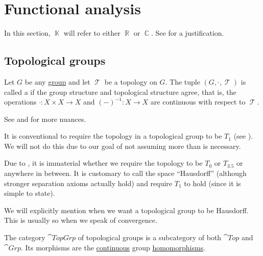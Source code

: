 \section{Functional analysis}\label{sec:functional_analysis}

In this section, \( \BbbK \) will refer to either \( \BbbR \) or \( \BbbC \). See  for a justification.

\subsection{Topological groups}\label{subsec:topological_groups}

\begin{definition}\label{def:topological_group}
  Let \( G \) be any \hyperref[def:group]{group} and let \( \mscrT \) be a topology on \( G \). The tuple \( (G, \cdot, \mscrT) \) is called a  if the group structure and topological structure agree, that is, the operations \( \cdot: X \times X \to X \) and \( (-)^{-1}: X \to X \) are continuous with respect to \( \mscrT \).

  See  and  for more nuances.
\end{definition}

\begin{remark}\label{rem:hausdorff_topological_groups}
  It is conventional to require the topology in a topological group to be \( T_1 \) (see ). We will not do this due to our goal of not assuming more than is necessary.

  Due to , it is immaterial whether we require the topology to be \( T_0 \) or \( T_{3.5} \) or anywhere in between. It is customary to call the space \enquote{Hausdorff} (although stronger separation axioms actually hold) and require \( T_1 \) to hold (since it is simple to state).

  We will explicitly mention when we want a topological group to be Hausdorff. This is usually so when we speak of convergence.
\end{remark}

\begin{definition}\label{def:category_of_topological_groups}
  The category \( \cat{TopGrp} \) of topological groups is a subcategory of both \( \cat{Top} \) and \( \cat{Grp} \). Its morphisms are the \hyperref[def:global_continuity]{continuous} group \hyperref[thm:group_homomorphism_single_condition]{homomorphisms}.
\end{definition}

